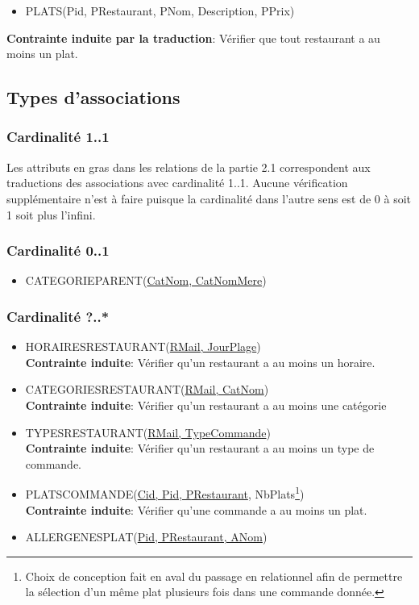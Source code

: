 \documentclass[10pt, a4paper]{article}
\begin{document}
\begin{itemize}
    \item PLATS\@(Pid, PRestaurant, PNom, Description, PPrix)
\end{itemize}

\textbf{Contrainte induite par la traduction}: Vérifier que tout restaurant a au moins un plat.

\subsection{Types d'associations}

\subsubsection{Cardinalité 1..1}

Les attributs en gras dans les relations de la partie 2.1 correspondent aux traductions des associations avec cardinalité 1..1.
Aucune vérification supplémentaire n'est à faire puisque la cardinalité dans l'autre sens est de 0 à soit 1 soit plus l'infini.
\subsubsection{Cardinalité 0..1}

\begin{itemize}
    \item CATEGORIEPARENT\@(\underline{CatNom, CatNomMere})
\end{itemize}

\subsubsection{Cardinalité ?..*}

\begin{itemize}
    \item HORAIRESRESTAURANT\@(\underline{RMail, JourPlage})\\
          \textbf{Contrainte induite}: Vérifier qu'un restaurant a au moins un horaire.
    \item CATEGORIESRESTAURANT\@(\underline{RMail, CatNom})\\
          \textbf{Contrainte induite}: Vérifier qu'un restaurant a au moins une catégorie
    \item TYPESRESTAURANT\@(\underline{RMail, TypeCommande})\\
          \textbf{Contrainte induite}: Vérifier qu'un restaurant a au moins un type de commande.
    \item PLATSCOMMANDE\@(\underline{Cid, Pid, PRestaurant}, NbPlats\footnote[1]{Choix de conception fait en aval du passage en relationnel afin de permettre la sélection d'un même plat plusieurs fois dans une commande donnée.})\\
          \textbf{Contrainte induite}: Vérifier qu'une commande a au moins un plat.
    \item ALLERGENESPLAT\@(\underline{Pid, PRestaurant, ANom})
\end{itemize}
\end{document}
